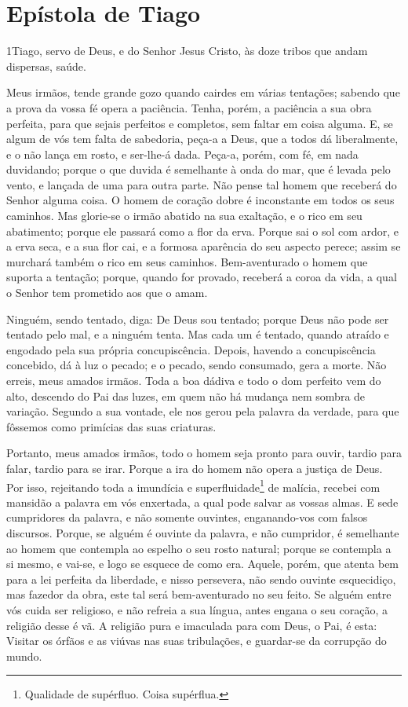 \thispagestyle{empty}
\chapter*{Epístola de Tiago}

\lettrine{1} Tiago, servo de Deus, e do Senhor Jesus Cristo,
às doze tribos que andam dispersas, saúde.

Meus irmãos, tende grande gozo quando cairdes em várias tentações;
sabendo que a prova da vossa fé opera a paciência. Tenha,
porém, a paciência a sua obra perfeita, para que sejais perfeitos e
completos, sem faltar em coisa alguma. E, se algum de vós tem
falta de sabedoria, peça-a a Deus, que a todos dá liberalmente, e o
não lança em rosto, e ser-lhe-á dada. Peça-a, porém, com fé, em
nada duvidando; porque o que duvida é semelhante à onda do mar, que
é levada pelo vento, e lançada de uma para outra parte. Não
pense tal homem que receberá do Senhor alguma coisa. O homem de
coração dobre é inconstante em todos os seus caminhos. Mas
glorie-se o irmão abatido na sua exaltação, e o rico em seu
abatimento; porque ele passará como a flor da erva. Porque
sai o sol com ardor, e a erva seca, e a sua flor cai, e a formosa
aparência do seu aspecto perece; assim se murchará também o rico em
seus caminhos. Bem-aventurado o homem que suporta a tentação;
porque, quando for provado, receberá a coroa da vida, a qual o
Senhor tem prometido aos que o amam.

Ninguém, sendo tentado, diga: De Deus sou tentado; porque Deus
não pode ser tentado pelo mal, e a ninguém tenta. Mas cada um
é tentado, quando atraído e engodado pela sua própria
concupiscência. Depois, havendo a concupiscência concebido,
dá à luz o pecado; e o pecado, sendo consumado, gera a morte.
Não erreis, meus amados irmãos. Toda a boa dádiva e
todo o dom perfeito vem do alto, descendo do Pai das luzes, em quem
não há mudança nem sombra de variação. Segundo a sua vontade,
ele nos gerou pela palavra da verdade, para que fôssemos como
primícias das suas criaturas.

Portanto, meus amados irmãos, todo o homem seja pronto para
ouvir, tardio para falar, tardio para se irar. Porque a ira
do homem não opera a justiça de Deus. Por isso, rejeitando
toda a imundícia e superfluidade\footnote{Qualidade de supérfluo.
Coisa supérflua.} de malícia, recebei com mansidão a palavra em vós
enxertada, a qual pode salvar as vossas almas. E sede
cumpridores da palavra, e não somente ouvintes, enganando-vos com
falsos discursos. Porque, se alguém é ouvinte da palavra, e
não cumpridor, é semelhante ao homem que contempla ao espelho o seu
rosto natural; porque se contempla a si mesmo, e vai-se, e
logo se esquece de como era. Aquele, porém, que atenta bem
para a lei perfeita da liberdade, e nisso persevera, não sendo
ouvinte esquecidiço, mas fazedor da obra, este tal será
bem-aventurado no seu feito. Se alguém entre vós cuida ser
religioso, e não refreia a sua língua, antes engana o seu coração, a
religião desse é vã. A religião pura e imaculada para com
Deus, o Pai, é esta: Visitar os órfãos e as viúvas nas suas
tribulações, e guardar-se da corrupção do mundo.


